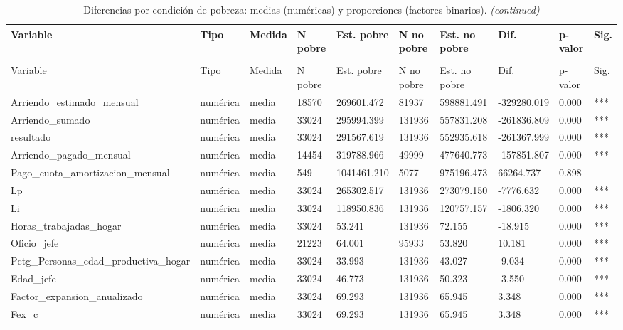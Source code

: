 
\begin{longtable}[t]{llllllllll}
\caption{\label{tab:tab:diff_mix_pobreza}Diferencias por condición de pobreza: medias (numéricas) y proporciones (factores binarios).}\\
\toprule
Variable & Tipo & Medida & N pobre & Est. pobre & N no pobre & Est. no pobre & Dif. & p-valor & Sig.\\
\midrule
\endfirsthead
\caption[]{Diferencias por condición de pobreza: medias (numéricas) y proporciones (factores binarios). \textit{(continued)}}\\
\toprule
Variable & Tipo & Medida & N pobre & Est. pobre & N no pobre & Est. no pobre & Dif. & p-valor & Sig.\\
\midrule
\endhead

\endfoot
\bottomrule
\endlastfoot
Arriendo\_estimado\_mensual & numérica & media & 18570 & 269601.472 & 81937 & 598881.491 & -329280.019 & 0.000 & ***\\
Arriendo\_sumado & numérica & media & 33024 & 295994.399 & 131936 & 557831.208 & -261836.809 & 0.000 & ***\\
resultado & numérica & media & 33024 & 291567.619 & 131936 & 552935.618 & -261367.999 & 0.000 & ***\\
Arriendo\_pagado\_mensual & numérica & media & 14454 & 319788.966 & 49999 & 477640.773 & -157851.807 & 0.000 & ***\\
Pago\_cuota\_amortizacion\_mensual & numérica & media & 549 & 1041461.210 & 5077 & 975196.473 & 66264.737 & 0.898 & \\
Lp & numérica & media & 33024 & 265302.517 & 131936 & 273079.150 & -7776.632 & 0.000 & ***\\
Li & numérica & media & 33024 & 118950.836 & 131936 & 120757.157 & -1806.320 & 0.000 & ***\\
Horas\_trabajadas\_hogar & numérica & media & 33024 & 53.241 & 131936 & 72.155 & -18.915 & 0.000 & ***\\
Oficio\_jefe & numérica & media & 21223 & 64.001 & 95933 & 53.820 & 10.181 & 0.000 & ***\\
Pctg\_Personas\_edad\_productiva\_hogar & numérica & media & 33024 & 33.993 & 131936 & 43.027 & -9.034 & 0.000 & ***\\
Edad\_jefe & numérica & media & 33024 & 46.773 & 131936 & 50.323 & -3.550 & 0.000 & ***\\
Factor\_expansion\_anualizado & numérica & media & 33024 & 69.293 & 131936 & 65.945 & 3.348 & 0.000 & ***\\
Fex\_c & numérica & media & 33024 & 69.293 & 131936 & 65.945 & 3.348 & 0.000 & ***\\

\end{longtable}
